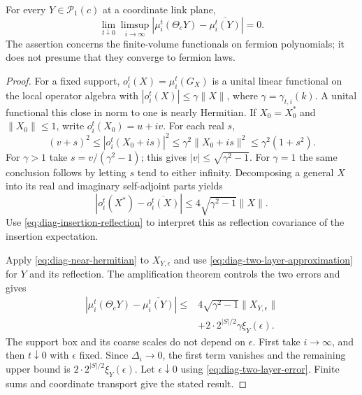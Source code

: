 \documentclass[11pt,letterpaper,reqno]{amsart}
\begin{document}
\begin{proposition}\label{prop:diag-two-layer-principle}
For every $Y\in\mathcal P_1(c)$ at a coordinate link plane,
\begin{equation}\label{eq:diag-two-layer-principle}
 \lim_{t\downarrow0}\limsup_{i\to\infty}
    |\mu_i^t(\Theta_cY)-\overline{\mu_i^t(Y)}|=0.
\end{equation}
The assertion concerns the finite-volume functionals on fermion
polynomials; it does not presume that they converge to fermion
laws.
\end{proposition}

\begin{proof}
For a fixed support, $o_i^t(X)=\mu_i^t(G_X)$ is a unital linear
functional on the local operator algebra with
$|o_i^t(X)|\le\gamma\|X\|$, where
$\gamma=\gamma_{t,i}(k)$. A unital functional this close in norm
to one is nearly Hermitian. If $X_0=X_0^*$ and $\|X_0\|\le1$,
write $o_i^t(X_0)=u+iv$. For each real $s$,
\[
 (v+s)^2\le |o_i^t(X_0+is)|^2
            \le\gamma^2\|X_0+is\|^2
            \le\gamma^2(1+s^2).
\]
For $\gamma>1$ take $s=v/(\gamma^2-1)$; this gives
$|v|\le\sqrt{\gamma^2-1}$. For $\gamma=1$ the same conclusion
follows by letting $s$ tend to either infinity. Decomposing a
general $X$ into its real and imaginary self-adjoint parts yields
\begin{equation}\label{eq:diag-near-hermitian}
 |o_i^t(X^*)-\overline{o_i^t(X)}|
           \le4\sqrt{\gamma^2-1}\|X\|.
\end{equation}
Use \eqref{eq:diag-insertion-reflection} to interpret this as
reflection covariance of the insertion expectation.

Apply \eqref{eq:diag-near-hermitian} to $X_{Y,\epsilon}$ and
use \eqref{eq:diag-two-layer-approximation} for $Y$ and its
reflection. The amplification theorem controls the two errors
and gives
\begin{equation}\label{eq:diag-two-layer-finite-error}
 \begin{split}
 |\mu_i^t(\Theta_cY)-\overline{\mu_i^t(Y)}|
 \le{}&4\sqrt{\gamma^2-1}\|X_{Y,\epsilon}\|\\
      &+2\cdot2^{|S|/2}\gamma\xi_Y(\epsilon).
 \end{split}
\end{equation}
The support box and its coarse scales do not depend on
$\epsilon$. First take $i\to\infty$, and then $t\downarrow0$
with $\epsilon$ fixed. Since $\Delta_i\to0$, the first term
vanishes and the remaining upper bound is
$2\cdot2^{|S|/2}\xi_Y(\epsilon)$. Let $\epsilon\downarrow0$
using \eqref{eq:diag-two-layer-error}. Finite sums and coordinate
transport give the stated result.
\end{proof}
\end{document}
